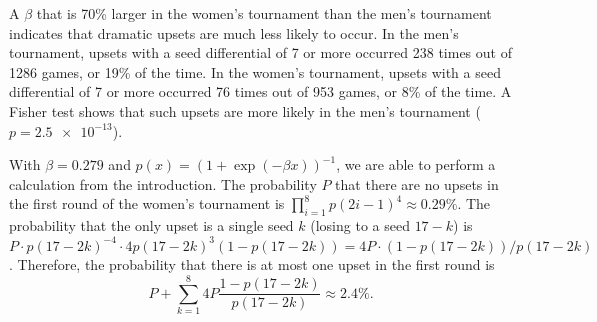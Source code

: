 \documentclass{article}
\newcommand{\betaBbwD}{0.279}
\begin{document}
A $\beta$ that is 70\% larger in the women's tournament than the men's tournament indicates that dramatic upsets are much less likely to occur.  In the men's tournament, upsets with a seed differential of 7 or more occurred 238 times out of 1286 games, or 19\% of the time.  In the women's tournament, upsets with a seed differential of 7 or more occurred 76 times out of 953 games, or 8\% of the time.  A Fisher test shows that such upsets are more likely in the men's tournament ($p=\num{2.5e-13}$).

With $\beta=\betaBbwD$ and $p(x)=(1+\exp(-\beta x))^{-1}$, we are able to perform a calculation from the introduction.  The probability $P$ that there are no upsets in the first round of the women's tournament is $\prod_{i=1}^8 p(2i-1)^4\approx0.29\%$. The probability that the only upset is a single seed $k$ (losing to a seed $17-k$) is $P\cdot p(17-2k)^{-4}\cdot4p(17-2k)^3(1-p(17-2k))=4P\cdot(1-p(17-2k))/p(17-2k)$.  Therefore, the probability that there is at most one upset in the first round is
\[P+\sum_{k=1}^8 4P\frac{1-p(17-2k)}{p(17-2k)}\approx2.4\%.\]
\end{document}
